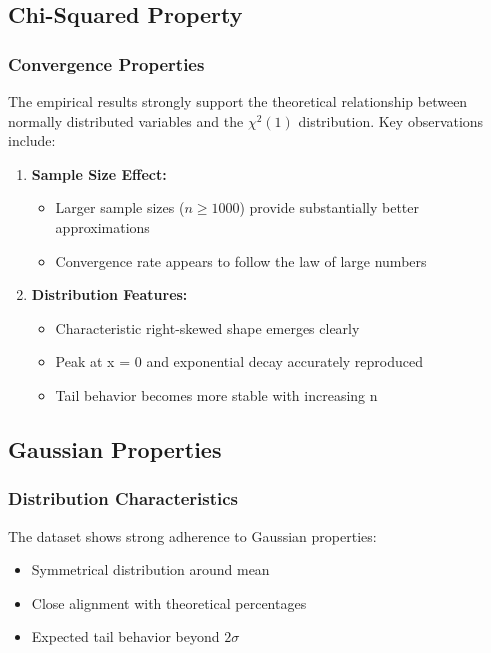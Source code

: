 \documentclass[12pt]{article}
\begin{document}
\subsection{Chi-Squared Property}
\subsubsection{Convergence Properties}
The empirical results strongly support the theoretical relationship between normally distributed variables and the $\chi^2(1)$ distribution. Key observations include:

\begin{enumerate}
    \item \textbf{Sample Size Effect:} 
    \begin{itemize}
        \item Larger sample sizes ($n \geq 1000$) provide substantially better approximations
        \item Convergence rate appears to follow the law of large numbers
    \end{itemize}
    
    \item \textbf{Distribution Features:}
    \begin{itemize}
        \item Characteristic right-skewed shape emerges clearly
        \item Peak at x = 0 and exponential decay accurately reproduced
        \item Tail behavior becomes more stable with increasing n
    \end{itemize}
\end{enumerate}

\subsection{Gaussian Properties}
\subsubsection{Distribution Characteristics}
The dataset shows strong adherence to Gaussian properties:
\begin{itemize}
    \item Symmetrical distribution around mean
    \item Close alignment with theoretical percentages
    \item Expected tail behavior beyond $2\sigma$
\end{itemize}
\end{document}
